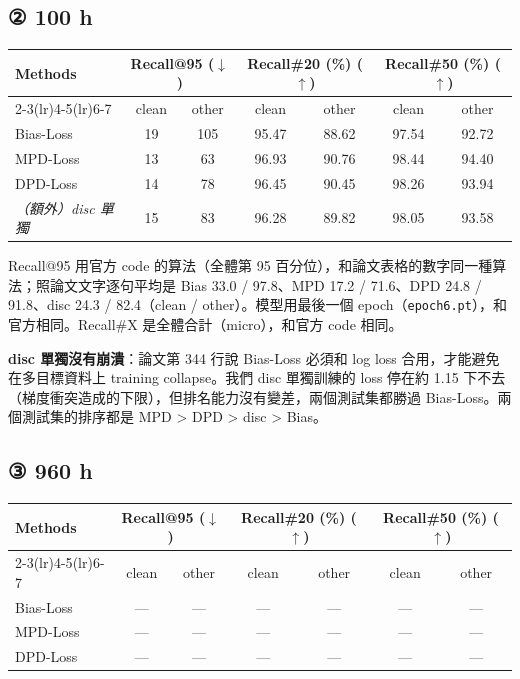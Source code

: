 \documentclass[11pt,a4paper]{article}
\newcommand{\todo}{---}                 %
\begin{document}
\subsection*{② 100 h}

\begin{center}
\begin{tabular}{lcccccc}
\toprule
\multirow{2}{*}{\textbf{Methods}} & \multicolumn{2}{c}{\textbf{Recall@95} ($\downarrow$)} & \multicolumn{2}{c}{\textbf{Recall\#20} (\%) ($\uparrow$)} & \multicolumn{2}{c}{\textbf{Recall\#50} (\%) ($\uparrow$)} \\
\cmidrule(lr){2-3}\cmidrule(lr){4-5}\cmidrule(lr){6-7}
 & clean & other & clean & other & clean & other \\
\midrule
Bias-Loss & 19 & 105 & 95.47 & 88.62 & 97.54 & 92.72 \\
MPD-Loss  & 13 & 63 & 96.93 & 90.76 & 98.44 & 94.40 \\
DPD-Loss  & 14 & 78 & 96.45 & 90.45 & 98.26 & 93.94 \\
\midrule
\textit{（額外）disc 單獨} & 15 & 83 & 96.28 & 89.82 & 98.05 & 93.58 \\
\bottomrule
\end{tabular}
\end{center}

{\small Recall@95 用官方 code 的算法（全體第 95 百分位），和論文表格的數字同一種算法；照論文文字逐句平均是 Bias 33.0 / 97.8、MPD 17.2 / 71.6、DPD 24.8 / 91.8、disc 24.3 / 82.4（clean / other）。模型用最後一個 epoch（\texttt{epoch6.pt}），和官方相同。Recall\#X 是全體合計（micro），和官方 code 相同。\par}

{\small \textbf{disc 單獨沒有崩潰}：論文第 344 行說 Bias-Loss 必須和 log loss 合用，才能避免在多目標資料上 training collapse。我們 disc 單獨訓練的 loss 停在約 1.15 下不去（梯度衝突造成的下限），但排名能力沒有變差，兩個測試集都勝過 Bias-Loss。兩個測試集的排序都是 MPD > DPD > disc > Bias。\par}

\subsection*{③ 960 h}

\begin{center}
\begin{tabular}{lcccccc}
\toprule
\multirow{2}{*}{\textbf{Methods}} & \multicolumn{2}{c}{\textbf{Recall@95} ($\downarrow$)} & \multicolumn{2}{c}{\textbf{Recall\#20} (\%) ($\uparrow$)} & \multicolumn{2}{c}{\textbf{Recall\#50} (\%) ($\uparrow$)} \\
\cmidrule(lr){2-3}\cmidrule(lr){4-5}\cmidrule(lr){6-7}
 & clean & other & clean & other & clean & other \\
\midrule
Bias-Loss & \todo & \todo & \todo & \todo & \todo & \todo \\
MPD-Loss  & \todo & \todo & \todo & \todo & \todo & \todo \\
DPD-Loss  & \todo & \todo & \todo & \todo & \todo & \todo \\
\bottomrule
\end{tabular}
\end{center}
\end{document}
